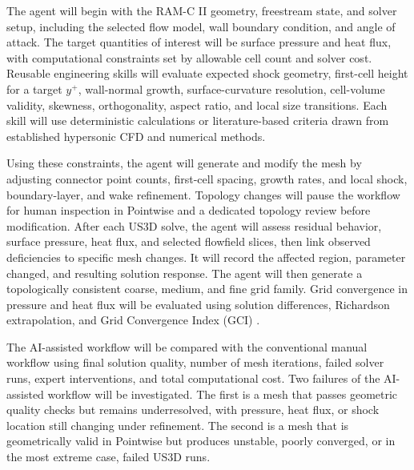\documentclass[11pt]{article}
\begin{document}
The agent will begin with the RAM-C II geometry, freestream state, and solver setup, including the selected flow model, wall boundary condition, and angle of attack. 
The target quantities of interest will be surface pressure and heat flux, with computational constraints set by allowable cell count and solver cost. 
Reusable engineering skills will evaluate expected shock geometry, first-cell height for a target \(y^+\), wall-normal growth, surface-curvature resolution, cell-volume validity, skewness, orthogonality, aspect ratio, and local size transitions. 
Each skill will use deterministic calculations or literature-based criteria drawn from established hypersonic CFD and numerical methods.

Using these constraints, the agent will generate and modify the mesh by adjusting connector point counts, first-cell spacing, growth rates, and local shock, boundary-layer, and wake refinement. 
Topology changes will pause the workflow for human inspection in Pointwise and a dedicated topology review before modification. 
After each US3D solve, the agent will assess residual behavior, surface pressure, heat flux, and selected flowfield slices, then link observed deficiencies to specific mesh changes. 
It will record the affected region, parameter changed, and resulting solution response. 
The agent will then generate a topologically consistent coarse, medium, and fine grid family. 
Grid convergence in pressure and heat flux will be evaluated using solution differences, Richardson extrapolation, and Grid Convergence Index (GCI) \cite{Roache1994GridRefinement}.

The AI-assisted workflow will be compared with the conventional manual workflow using final solution quality, number of mesh iterations, failed solver runs, expert interventions, and total computational cost. 
Two failures of the AI-assisted workflow will be investigated. 
The first is a mesh that passes geometric quality checks but remains underresolved, with pressure, heat flux, or shock location still changing under refinement. 
The second is a mesh that is geometrically valid in Pointwise but produces unstable, poorly converged, or in the most extreme case, failed US3D runs. 

\newpage


\end{document}
